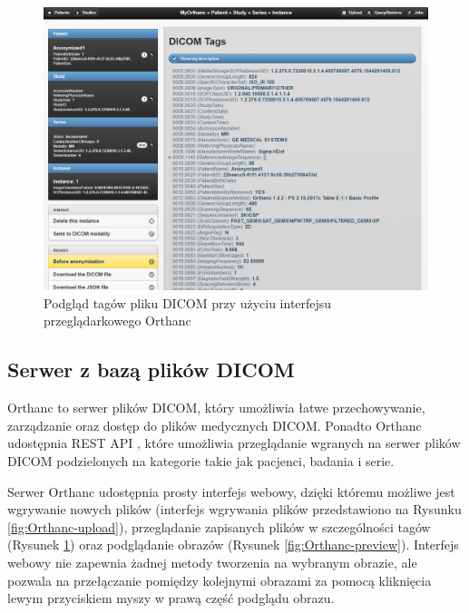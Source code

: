 \documentclass[a4paper,11pt,twoside,openright]{report}
\theoremstyle{definition}
\begin{document}
\begin{figure}[tbh!]
	\center
	\includegraphics[width=1\textwidth]{Orthanc-tags}
	\caption{Podgląd tagów pliku DICOM przy użyciu interfejsu przeglądarkowego Orthanc}
    	\label{fig:Orthanc-tags}
\end{figure}

\subsection {Serwer z bazą plików DICOM}

Orthanc \cite{Orthanc} to serwer plików DICOM, który umożliwia łatwe przechowywanie,
zarządzanie oraz dostęp do plików medycznych DICOM. Ponadto Orthanc udostępnia
REST API \cite{Orthanc API}, które umożliwia przeglądanie wgranych na serwer plików DICOM podzielonych
na kategorie takie jak pacjenci, badania i serie.

Serwer Orthanc udostępnia prosty interfejs webowy, dzięki któremu możliwe jest
wgrywanie nowych plików (interfejs wgrywania plików przedstawiono na Rysunku
\ref{fig:Orthanc-upload}), przeglądanie zapisanych plików w szczególności
tagów (Rysunek \ref{fig:Orthanc-tags}) oraz podglądanie obrazów (Rysunek \ref{fig:Orthanc-preview}).
Interfejs webowy nie zapewnia żadnej metody tworzenia na wybranym obrazie, ale
pozwala na przełączanie pomiędzy kolejnymi obrazami za pomocą kliknięcia lewym
przyciskiem myszy w prawą część podglądu obrazu.
\end{document}
